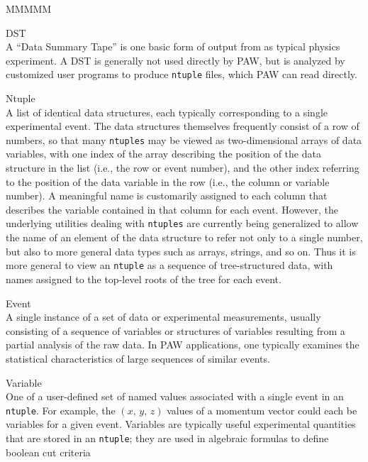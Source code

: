 \begin{DL}{MMMMM}
\item{DST} \mbox{}\\
     A ``Data Summary Tape'' is one basic form of  output from
     as typical physics experiment.  A DST is generally not used
     directly by PAW, but is analyzed by customized user programs
     to produce \verb|ntuple| files, which PAW can read directly.
\item[Ntuple]\mbox{}\\
     A list of identical data structures, each typically corresponding
     to a single experimental event.  The data structures
     themselves frequently consist of a row of numbers, so that
     many \verb|ntuples| may be viewed as
     two-dimensional arrays of data variables, with one
     index of the array describing the position of the data
     structure in the list (i.e., the row or event number),
     and the other index referring to the position of the data
     variable in the row (i.e., the column or variable number).
     A meaningful name is customarily assigned to each column
     that describes the variable contained in that column for each
     event.  However, the underlying utilities dealing with
     \verb|ntuples|  are currently being generalized to allow
     the name of an element of the data structure to refer
     not only to a single number, but also
     to more general data types such as arrays, strings, and so on.
     Thus it is more general to view an \verb|ntuple| as a sequence
     of tree-structured data, with names assigned to the top-level
     roots of the tree for each event.
\item[Event]\mbox{}\\
     A single instance of a set of data  or experimental measurements,
     usually consisting of a sequence of variables or structures of
     variables resulting from a partial analysis of the raw data.
     In PAW applications, one typically examines the statistical
     characteristics of large sequences of similar events.
\item[Variable]\mbox{}\\
     One of a user-defined set of named values associated with a single
     event in an \verb|ntuple|.
     For example,
     the $(x,\,y,\,z)$ values of a momentum vector could each
     be variables for a given event.  Variables are typically
     useful experimental quantities that are stored in an
     \verb|ntuple|;  they are used in algebraic formulas
     to define boolean cut criteria

\end{DL}
